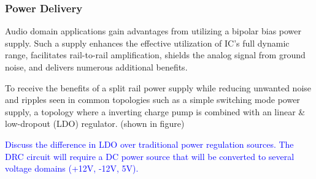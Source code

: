 \documentclass[10pt]{article}
\begin{document}
\begin{multicols*}{2}
                \subsubsection{Power Delivery}
                    Audio domain applications gain advantages from utilizing a bipolar bias power supply. Such a supply enhances the effective utilization of IC's full dynamic range, facilitates rail-to-rail amplification, shields the analog signal from ground noise, and delivers numerous additional benefits. \cite{ti-3-v-rails}\par
                    To receive the benefits of a split rail power supply while reducing unwanted noise and ripples seen in common topologies such as a simple switching mode power supply, a topology where a inverting charge pump is combined with an linear \& low-dropout (LDO) regulator. (shown in figure)\par
                    \textcolor{blue}{Discuss the difference in LDO over traditional power regulation sources. The DRC circuit will require a DC power source that will be converted to several voltage domains (+12V, -12V, 5V).}
                    
                    \noindent
                    \begin{minipage}{\linewidth}

                        \centering

\end{minipage}
\end{multicols*}
\end{document}
